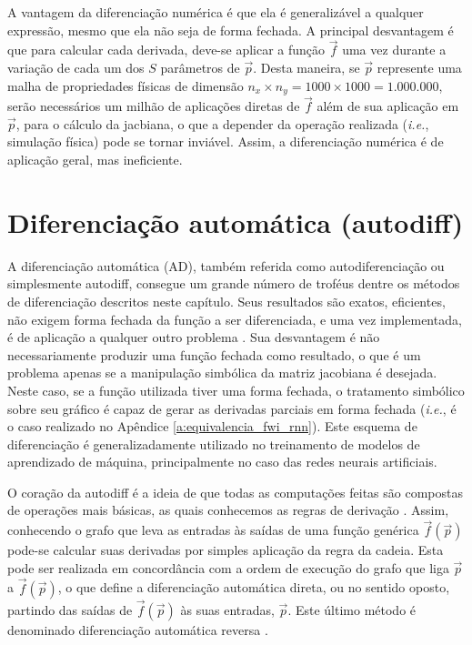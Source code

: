     A vantagem da diferenciação numérica é que ela é generalizável a qualquer expressão, mesmo que ela não seja de forma fechada. A principal desvantagem é que para calcular cada derivada, deve-se aplicar a função $\vec{f}$ uma vez durante a variação de cada um dos $S$ parâmetros de $\vec{p}$. Desta maneira, se $\vec{p}$ represente uma malha de propriedades físicas de dimensão $n_x\times n_y = 1000 \times 1000 = 1.000.000$, serão necessários um milhão de aplicações diretas de $\vec{f}$ além de sua aplicação em $\vec{p}$, para o cálculo da jacbiana, o que a depender da operação realizada (\textit{i.e.}, simulação física) pode se tornar inviável. Assim, a diferenciação numérica é de aplicação geral, mas ineficiente.

  \section{Diferenciação automática (autodiff)}


    A diferenciação automática (AD), também referida como autodiferenciação ou simplesmente autodiff, consegue um grande número de troféus dentre os métodos de diferenciação descritos neste capítulo. Seus resultados são exatos, eficientes, não exigem forma fechada da função a ser diferenciada, e uma vez implementada, é de aplicação a qualquer outro problema . Sua desvantagem é não necessariamente produzir uma função fechada como resultado, o que é um problema apenas se a manipulação simbólica da matriz jacobiana é desejada. Neste caso, se a função utilizada tiver uma forma fechada, o tratamento simbólico sobre seu gráfico é capaz de gerar as derivadas parciais em forma fechada (\textit{i.e.}, é o caso realizado no Apêndice \ref{a:equivalencia_fwi_rnn}). Este esquema de diferenciação é generalizadamente utilizado no treinamento de modelos de aprendizado de máquina, principalmente no caso das redes neurais artificiais.

    O coração da autodiff é a ideia de que todas as computações feitas são compostas de operações mais básicas, as quais conhecemos as regras de derivação . Assim, conhecendo o grafo que leva as entradas às saídas de uma função genérica $\vec{f}(\vec{p})$ pode-se calcular suas derivadas por simples aplicação da regra da cadeia. Esta pode ser realizada em concordância com a ordem de execução do grafo que liga $\vec{p}$ a $\vec{f}(\vec{p})$, o que define a diferenciação automática direta, ou no sentido oposto, partindo das saídas de $\vec{f}(\vec{p})$ às suas entradas, $\vec{p}$. Este último método é denominado diferenciação automática reversa .

